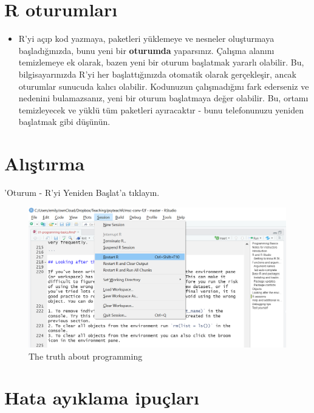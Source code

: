 \documentclass[
  oneside]{book}
\providecommand{\tightlist}{%
  \setlength{\itemsep}{0pt}\setlength{\parskip}{0pt}}
\begin{document}
\hypertarget{r-oturumlarux131}{%
\section{R oturumları}\label{r-oturumlarux131}}

\begin{itemize}
\tightlist
\item
  R'yi açıp kod yazmaya, paketleri yüklemeye ve nesneler oluşturmaya başladığınızda, bunu yeni bir \textbf{oturumda} yaparsınız. Çalışma alanını temizlemeye ek olarak, bazen yeni bir oturum başlatmak yararlı olabilir. Bu, bilgisayarınızda R'yi her başlattığınızda otomatik olarak gerçekleşir, ancak oturumlar sunucuda kalıcı olabilir. Kodunuzun çalışmadığını fark ederseniz ve nedenini bulamazsanız, yeni bir oturum başlatmaya değer olabilir. Bu, ortamı temizleyecek ve yüklü tüm paketleri ayıracaktır - bunu telefonunuzu yeniden başlatmak gibi düşünün.
\end{itemize}

\hypertarget{alux131ux15ftux131rma}{%
\section{Alıştırma}\label{alux131ux15ftux131rma}}

'Oturum - R'yi Yeniden Başlat'a tıklayın.

\begin{figure}

{\centering \includegraphics[width=1\linewidth]{images/new_session} 

}

\caption{The truth about programming}\label{fig:img-session}
\end{figure}

\hypertarget{hata-ayux131klama-ipuuxe7larux131}{%
\section{Hata ayıklama ipuçları}\label{hata-ayux131klama-ipuuxe7larux131}}
\end{document}
